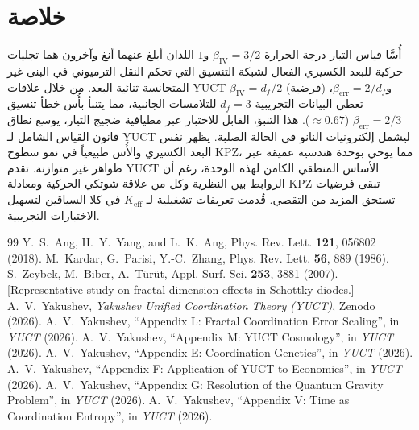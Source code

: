 \documentclass[11pt,a4paper]{article}
\newcommand{\Keff}{K_{\mathrm{eff}}}
\begin{document}
	\section{خلاصة}
	أُسَّا قياس التيار-درجة الحرارة \(\beta_{\mathrm{IV}} = 3/2\) و\(1\) اللذان أبلغ عنهما أنغ وآخرون هما تجليات حركية للبعد الكسيري الفعال لشبكة التنسيق التي تحكم النقل الترميوني في البنى غير المتجانسة ثنائية البعد. من خلال علاقات YUCT \(\beta_{\mathrm{IV}} = d_f/2\) (فرضية) و\(\beta_{\mathrm{err}} = 2/d_f\)، تعطي البيانات التجريبية \(d_f = 3\) للتلامسات الجانبية، مما يتنبأ بأُس خطأ تنسيق \(\beta_{\mathrm{err}} = 2/3\) (\(\approx 0.67\)). هذا التنبؤ، القابل للاختبار عبر مطيافية ضجيج التيار، يوسع نطاق قانون القياس الشامل لـ YUCT ليشمل إلكترونيات النانو في الحالة الصلبة. يظهر نفس البعد الكسيري والأُس طبيعياً في نمو سطوح KPZ، مما يوحي بوحدة هندسية عميقة عبر ظواهر غير متوازنة. تقدم YUCT الأساس المنطقي الكامن لهذه الوحدة، رغم أن الروابط بين النظرية وكل من علاقة شوتكي الحركية ومعادلة KPZ تبقى فرضيات تستحق المزيد من التقصي. قُدمت تعريفات تشغيلية لـ \(\Keff\) في كلا السياقين لتسهيل الاختبارات التجريبية.
	
	\begin{thebibliography}{99}
		 Y.~S.~Ang, H.~Y.~Yang, and L.~K.~Ang,
		Phys. Rev. Lett. \textbf{121}, 056802 (2018).
		 M.~Kardar, G.~Parisi, Y.-C.~Zhang,
		Phys. Rev. Lett. \textbf{56}, 889 (1986).
		 S.~Zeybek, M.~Biber, A.~Türüt,
		Appl. Surf. Sci. \textbf{253}, 3881 (2007). [Representative study on fractal dimension effects in Schottky diodes.]
		 A.~V.~Yakushev, \emph{Yakushev Unified
			Coordination Theory (YUCT)}, Zenodo (2026).
		 A.~V.~Yakushev, ``Appendix L: Fractal
		Coordination Error Scaling'', in \emph{YUCT} (2026).
		 A.~V.~Yakushev, ``Appendix M: YUCT
		Cosmology'', in \emph{YUCT} (2026).
		 A.~V.~Yakushev, ``Appendix E: Coordination
		Genetics'', in \emph{YUCT} (2026).
		 A.~V.~Yakushev, ``Appendix F: Application of
		YUCT to Economics'', in \emph{YUCT} (2026).
		 A.~V.~Yakushev, ``Appendix G: Resolution of
		the Quantum Gravity Problem'', in \emph{YUCT} (2026).
		 A.~V.~Yakushev, ``Appendix V: Time as
		Coordination Entropy'', in \emph{YUCT} (2026).
	\end{thebibliography}
	
\end{document}
